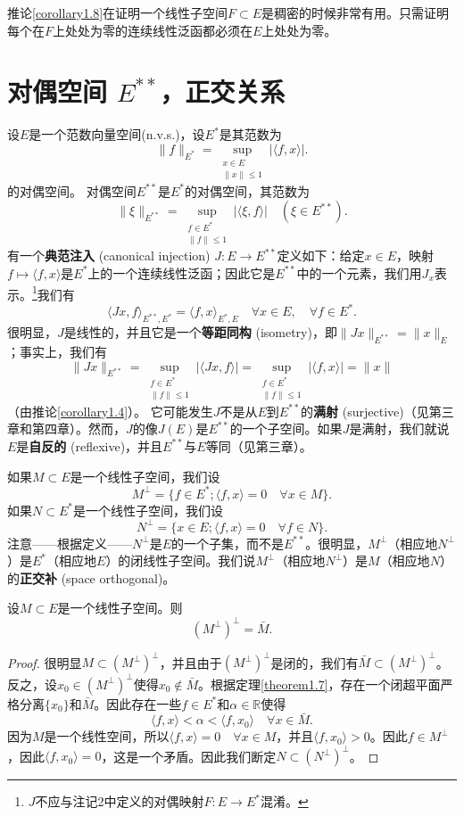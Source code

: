\begin{remark}
推论\ref{corollary1.8}在证明一个线性子空间$F \subset E$是稠密的时候非常有用。只需证明每个在$F$上处处为零的连续线性泛函都必须在$E$上处处为零。
\end{remark}

\section{对偶空间 $E^{**}$，正交关系}
设$E$是一个范数向量空间(n.v.s.)，设$E^*$是其范数为
\[ \|f\|_{E^*} = \sup_{\substack{x \in E \\ \|x\| \leq 1}} |\langle f, x \rangle|. \]
的对偶空间。
对偶空间$E^{**}$是$E^*$的对偶空间，其范数为
\[ \|\xi\|_{E^{**}} = \sup_{\substack{f \in E^* \\ \|f\| \leq 1}} |\langle \xi, f \rangle| \quad (\xi \in E^{**}). \]
有一个\textbf{典范注入} (canonical injection) $J: E \to E^{**}$定义如下：给定$x \in E$，映射$f \mapsto \langle f, x \rangle$是$E^*$上的一个连续线性泛函；因此它是$E^{**}$中的一个元素，我们用$J_x$表示。\footnote{$J$不应与注记2中定义的对偶映射$F: E \to E^*$混淆。}我们有
\[ \langle Jx, f \rangle_{E^{**}, E^*} = \langle f, x \rangle_{E^*, E} \quad \forall x \in E, \quad \forall f \in E^*. \]
很明显，$J$是线性的，并且它是一个\textbf{等距同构} (isometry)，即$\|Jx\|_{E^{**}} = \|x\|_{E}$；事实上，我们有
\[ \|Jx\|_{E^{**}} = \sup_{\substack{f \in E^* \\ \|f\| \leq 1}} |\langle Jx, f \rangle| = \sup_{\substack{f \in E^* \\ \|f\| \leq 1}} |\langle f, x \rangle| = \|x\| \]
（由推论\ref{corollary1.4}）。
它可能发生$J$不是从$E$到$E^{**}$的\textbf{满射} (surjective)（见第三章和第四章）。然而，$J$的像$J(E)$是$E^{**}$的一个子空间。如果$J$是满射，我们就说$E$是\textbf{自反的} (reflexive)，并且$E^{**}$与$E$等同（见第三章）。


如果$M \subset E$是一个线性子空间，我们设
\[ M^\perp = \{f \in E^*; \langle f, x \rangle = 0 \quad \forall x \in M\}. \]
如果$N \subset E^*$是一个线性子空间，我们设
\[ N^\perp = \{x \in E; \langle f, x \rangle = 0 \quad \forall f \in N\}. \]
注意——根据定义——$N^\perp$是$E$的一个子集，而不是$E^{**}$。很明显，$M^\perp$（相应地$N^\perp$）是$E^*$（相应地$E$）的闭线性子空间。我们说$M^\perp$（相应地$N^\perp$）是$M$（相应地$N$）的\textbf{正交补} (space orthogonal)。

\begin{proposition}\label{proposition1.9}
设$M \subset E$是一个线性子空间。则
\[ (M^\perp)^\perp = \bar{M}. \]
\end{proposition}
\begin{proof}
很明显$M \subset (M^\perp)^\perp$，并且由于$(M^\perp)^\perp$是闭的，我们有$\bar{M} \subset (M^\perp)^\perp$。反之，设$x_0 \in (M^\perp)^\perp$使得$x_0 \notin \bar{M}$。根据定理\ref{theorem1.7}，存在一个闭超平面严格分离$\{x_0\}$和$\bar{M}$。因此存在一些$f \in E^*$和$\alpha \in \mathbb{R}$使得
\[ \langle f, x \rangle < \alpha < \langle f, x_0 \rangle \quad \forall x \in \bar{M}. \]
因为$M$是一个线性空间，所以$\langle f, x \rangle = 0 \quad \forall x \in M$，并且$\langle f, x_0 \rangle > 0$。因此$f \in M^\perp$，因此$\langle f, x_0 \rangle = 0$，这是一个矛盾。因此我们断定$N \subset (N^\perp)^\perp$。
\end{proof}

